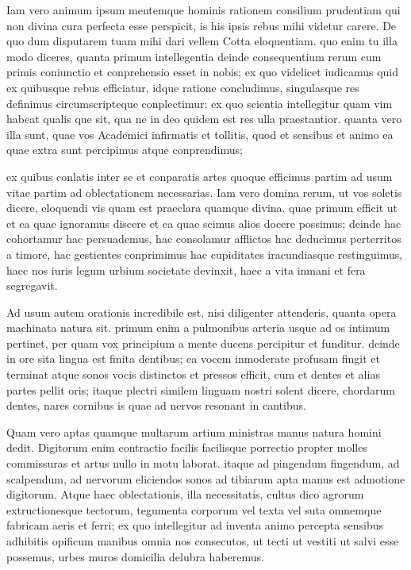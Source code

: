  Iam vero animum ipsum mentemque hominis rationem consilium prudentiam qui non divina cura perfecta esse perspicit, is his ipsis rebus mihi videtur carere. De quo dum disputarem tuam mihi dari vellem Cotta eloquentiam. quo enim tu illa modo diceres, quanta primum intellegentia deinde consequentium rerum cum primis coniunctio et conprehensio esset in nobis; ex quo videlicet iudicamus quid ex quibusque rebus efficiatur, idque ratione concludimus, singulasque res definimus circumscripteque conplectimur; ex quo scientia intellegitur quam vim habeat qualis que sit, qua ne in deo quidem est res ulla praestantior. quanta vero illa sunt, quae vos Academici infirmatis et tollitis, quod et sensibus et animo ea quae extra sunt percipimus atque conprendimus;

 ex quibus conlatis inter se et conparatis artes quoque efficimus partim ad usum vitae partim ad oblectationem necessarias. Iam vero domina rerum, ut vos soletis dicere, eloquendi vis quam est praeclara quamque divina. quae primum efficit ut et ea quae ignoramus discere et ea quae scimus alios docere possimus; deinde hac cohortamur hac persuademus, hac consolamur afflictos hac deducimus perterritos a timore, hac gestientes conprimimus hac cupiditates iracundiasque restinguimus, haec nos iuris legum urbium societate devinxit, haec a vita inmani et fera segregavit.

 Ad usum autem orationis incredibile est, nisi diligenter attenderis, quanta opera machinata natura sit. primum enim a pulmonibus arteria usque ad os intimum pertinet, per quam vox principium a mente ducens percipitur et funditur. deinde in ore sita lingua est finita dentibus; ea vocem inmoderate profusam fingit et terminat atque sonos vocis distinctos et pressos efficit, cum et dentes et alias partes pellit oris; itaque plectri similem linguam nostri solent dicere, chordarum dentes, nares cornibus is quae ad nervos resonant in cantibus.

 Quam vero aptas quamque multarum artium ministras manus natura homini dedit. Digitorum enim contractio facilis facilisque porrectio propter molles commissuras et artus nullo in motu laborat. itaque ad pingendum fingendum, ad scalpendum, ad nervorum eliciendos sonos ad tibiarum apta manus est admotione digitorum. Atque haec oblectationis, illa necessitatis, cultus dico agrorum extructionesque tectorum, tegumenta corporum vel texta vel suta omnemque fabricam aeris et ferri; ex quo intellegitur ad inventa animo percepta sensibus adhibitis opificum manibus omnia nos consecutos, ut tecti ut vestiti ut salvi esse possemus, urbes muros domicilia delubra haberemus.


